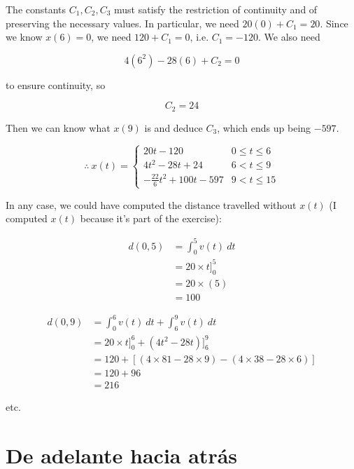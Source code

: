 \documentclass[12pt]{article}
\theoremstyle{definition}
\begin{document}
The constants $C_1, C_2, C_3$ must satisfy the restriction of continuity and of
preserving the necessary values. In particular, we need $20(0) + C_1 = 20$.
Since we know $x(6) = 0$, we need $120 + C_1 = 0$, i.e. $C_1 = -120$. We also
need 

\begin{equation*}
    4(6^2) - 28(6) + C_2 = 0
\end{equation*}

to ensure continuity, so

\begin{equation*}
    C_2 = 24
\end{equation*}

Then we can know what $x(9)$ is and deduce $C_3$, which ends up being $-597$.

\begin{equation*}
    \therefore ~ x(t) = \begin{cases}
        20t - 120 & 0 \leq t \leq 6 \\ 
        4t^2 -28t + 24 & 6 < t \leq 9 \\ 
        -\frac{22}{6}t^2 +100t - 597 & 9 < t \leq 15
    \end{cases}
\end{equation*}

In any case, we could have computed the distance travelled without $x(t)$ (I
computed $x(t)$ because it's part of the exercise):

\begin{align*}
    d(0,5) 
    &= \int_0^5 v(t) ~ dt  \\ 
    &= 20 \times t]_0^5 \\ 
    &= 20 \times (5) \\ 
    &= 100
\end{align*}

\begin{align*}
    d(0, 9) 
    &= \int_0^6 v(t) ~ dt + \int_6^9 v(t) ~ dt \\ 
    &= 20 \times t\Big]_0^6 + (4t^2 - 28t)\Big]_6^9 \\ 
    &=120 + \left[ (4 \times 81 - 28 \times 9) - (4 \times 38 - 28 \times 6)
    \right]  \\ 
    &= 120 + 96 \\ 
    &= 216
\end{align*}

etc.




\pagebreak
\section{De adelante hacia atrás}
\end{document}
